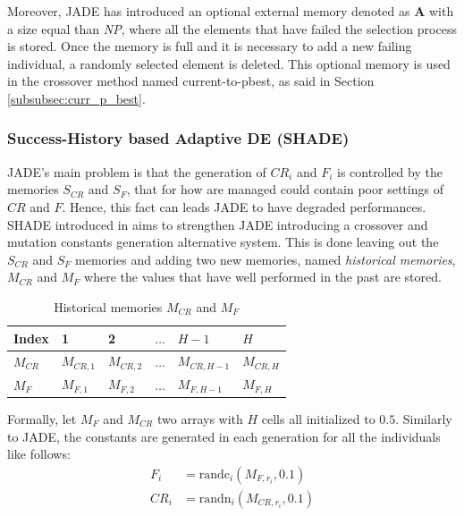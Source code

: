 Moreover, JADE has introduced an optional external memory denoted as \textbf{A} with a size equal than \textit{NP}, where all the elements that have failed the selection process is stored. Once the memory is full and it is necessary to add a new failing individual, a randomly selected element is deleted. This optional memory is used in the crossover method named current-to-pbest, as said in Section \ref{subsubsec:curr_p_best}.

\subsubsection{Success-History based Adaptive DE (SHADE)}
JADE's main problem is that the generation of $\textit{CR}_{i}$ and $F_{i}$ is controlled by the memories $S_{\textit{CR}}$ and $S_{F}$, that for how are managed could contain poor settings of $\textit{CR}$ and $F$. Hence, this fact can leads JADE to have degraded performances.\newline\newline
SHADE introduced in \cite{SHADE:2013} aims to strengthen JADE introducing a crossover and mutation constants generation alternative system. This is done leaving out the $S_{\textit{CR}}$ and $S_{F}$ memories and adding two new memories, named \textit{historical memories}, $M_{\textit{CR}}$ and $M_{F}$ where the values that have well performed in the past are stored.
\begin{table}[h]
	\centering
	\begin{tabular}{|l|l|l|l|l|l|}
		\hline
		Index             & 1                   & 2                   & $\dots$ & $H -1$                & $H$                 \\ 
		\hline
		$M_{\textit{CR}}$ & $M_{\textit{CR},1}$ & $M_{\textit{CR},2}$ & $\dots$ & $M_{\textit{CR},H-1}$ & $M_{\textit{CR},H}$ \\ 
		\hline
		$M_{F}$           & $M_{F, 1}$          & $M_{F, 2}$          & $\dots$ & $M_{F, H-1}$          & $M_{F, H}$          \\ 
		\hline
	\end{tabular}
	\caption{Historical memories $M_{\textit{CR}}$ and $M_{F}$}
\end{table}
Formally, let $M_{F}$ and $M_{\textit{CR}}$ two arrays with $H$ cells all initialized to $0.5$. Similarly to JADE, the constants are generated in each generation for all the individuals like follows:
\begin{align}
	F_i &= \textrm{randc}_{i}(M_{F, r_{i}}, 0.1) \\
	\textit{CR}_i &= \textrm{randn}_{i}(M_{\textit{CR},r_{i}}, 0.1)
\end{align}
